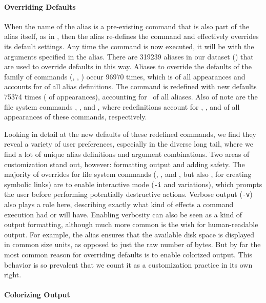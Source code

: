 \paragraph{\bf Overriding Defaults}

When the name of the alias is a pre-existing command that is also part of the alias itself, as in , then the alias re-defines the command and effectively overrides its default settings.
Any time the command is now executed, it will be with the arguments specified in the alias.
There are \num{319239} aliases in our dataset () that are used to override defaults in this way.
Aliases to override the defaults of the  family of commands (, , ) occur \num{96970} times, which is  of all  appearances and accounts for  of all alias definitions.
The  command is redefined with new defaults \num{75374} times ( of  appearances), accounting for  of all aliases.
Also of note are the file system commands , , and , where redefinitions account for , , and  of all appearances of these commands, respectively.

Looking in detail at the new defaults of these redefined commands, we find they reveal a variety of user preferences, especially in the diverse long tail, where we find a lot of unique alias definitions and argument combinations.
Two areas of customization stand out, however: formatting output and adding safety.
The majority of overrides for file system commands (, , and , but also , for creating symbolic links) are to enable interactive mode (\texttt{-i} and variations), which prompts the user before performing potentially destructive actions.
Verbose output (\texttt{-v}) also plays a role here, describing exactly what kind of effects a command execution had or will have.
Enabling verbosity can also be seen as a kind of output formatting, although much more common is the wish for human-readable output.
For example, the alias  ensures that the available disk space is displayed in common size units, as opposed to just the raw number of bytes.
But by far the most common reason for overriding defaults is to enable colorized output.
This behavior is so prevalent that we count it as a customization practice in its own right.

\paragraph{\bf Colorizing Output}

